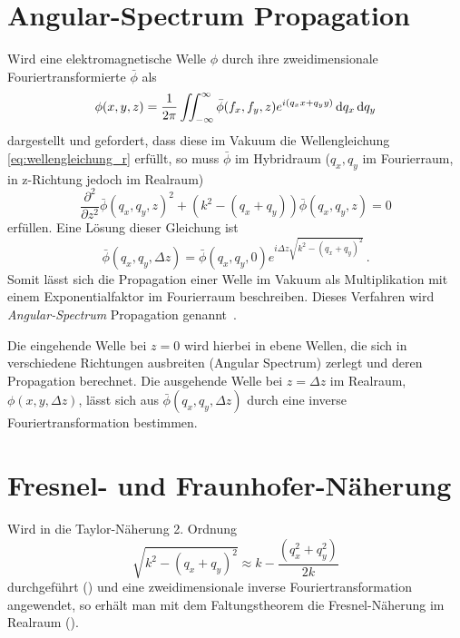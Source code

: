 \section{Angular-Spectrum Propagation}
Wird eine elektromagnetische Welle $\phi$ durch ihre zweidimensionale Fouriertransformierte $\bar{\phi}$ als
\begin{equation}
	\phi(x,y,z)=\frac{1}{2\pi}\iint_{-\infty}^{\infty}\bar{\phi}(f_x,f_y,z)e^{i(q_xx+q_yy)} \dif q_x \dif q_y
\end{equation}dargestellt und gefordert, dass diese im Vakuum die Wellengleichung \eqref{eq:wellengleichung_r} erfüllt,
so muss $\bar{\phi}$ im Hybridraum ($q_x,q_y$ im Fourierraum, in z-Richtung jedoch im Realraum)
\begin{equation}
	\label{eq:wellengleichung_h}
	\frac{\partial ^2}{\partial z^2}\bar{\phi}(q_x,q_y,z)^2+ \left(k^2-\left(q_x+q_y\right)\right)\bar{\phi}(q_x,q_y,z)=0
\end{equation}
erfüllen. Eine Lösung dieser Gleichung ist
\begin{equation}
	\label{eq:angularspectrum}
	\bar{\phi}\left(q_x,q_y,\Delta z\right)=\bar{\phi}(q_x,q_y,0)e^{i\Delta z\sqrt{k^2-(q_x+q_y)^2}}\, . 
\end{equation}
Somit lässt sich die Propagation einer Welle im Vakuum als Multiplikation mit einem Exponentialfaktor im Fourierraum beschreiben. Dieses Verfahren wird \textit{Angular-Spectrum} Propagation genannt~\cite{goodman2005}. 

Die eingehende Welle bei $z=0$ wird hierbei in ebene Wellen, die sich in verschiedene Richtungen ausbreiten (Angular Spectrum) zerlegt und deren Propagation berechnet. Die ausgehende Welle bei $z=\Delta z$ im Realraum, $\phi\left(x,y,\Delta z\right)$, lässt sich aus $\bar{\phi}\left(q_x,q_y,\Delta z\right)$ durch eine inverse Fouriertransformation bestimmen.


\section{Fresnel- und Fraunhofer-Näherung}
\label{chap:fraunhofer}
Wird in  die Taylor-Näherung 2. Ordnung
\begin{equation}
	\sqrt{k^2-(q_x+q_y)^2}\approx k-\frac{(q_x^2+q_y^2)}{2k}
\end{equation}
durchgeführt () und eine zweidimensionale inverse Fouriertransformation angewendet, so erhält man mit dem Faltungstheorem die Fresnel-Näherung im Realraum ().

